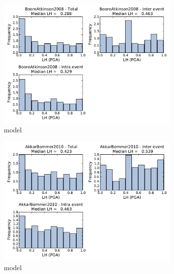 \begin{figure}[htb]
  \centering
  \begin{subfigure}[b]{0.49\textwidth}
      \includegraphics[width=\textwidth]{./figures/residuals/BA2008_LH_PGA.pdf}
      \caption{\textcite{boore2008} model}
      \label{fig:pga_lh_ba2008}
  \end{subfigure}
    \begin{subfigure}[b]{0.49\textwidth}
      \includegraphics[width=\textwidth]{./figures/residuals/AB2010_LH_PGA.pdf}
      \caption{\textcite{AkkarBommer2010} model}
      \label{fig:pga_lh_ab2010}
  \end{subfigure}
    \begin{subfigure}[b]{0.49\textwidth}

\end{subfigure}
\end{figure}
